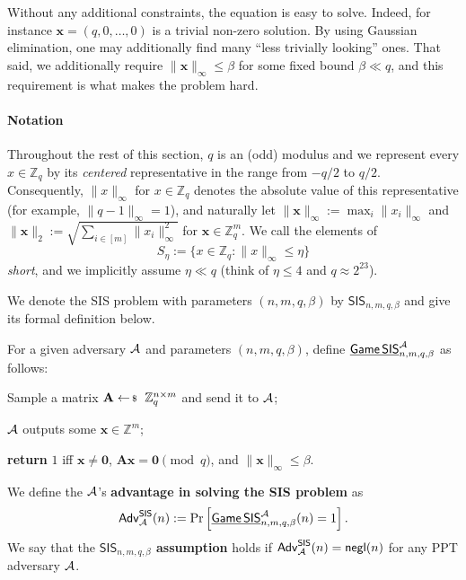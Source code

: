 \documentclass[../../book.tex]{subfiles}
\begin{document}
Without any additional constraints, the equation is easy to solve. Indeed, for instance $\mathbf{x} = (q,0,\dots,0)$ is a trivial non-zero solution. By using Gaussian elimination, one may additionally find many ``less trivially looking'' ones.
That said, we additionally require $\|\mathbf{x}\|_{\infty} \leq \beta$ for some fixed bound $\beta \ll q$, and this requirement is what makes the problem hard.

\paragraph{Notation}
Throughout the rest of this section, $q$ is an (odd) modulus and we represent every $x \in \mathbb{Z}_q$ by its \emph{centered} representative in the range from $-q/2$ to $q/2$.
Consequently, $\|x\|_{\infty}$ for $x \in \mathbb{Z}_q$ denotes the absolute value of this representative (for example, $\|q-1\|_{\infty} = 1$), and naturally let $\|\mathbf{x}\|_{\infty} := \max_i \|x_i\|_{\infty}$ and $\|\mathbf{x}\|_2 := \sqrt{\sum_{i \in [m]} \|x_i\|_{\infty}^2}$ for $\mathbf{x} \in \mathbb{Z}_q^m$.
We call the elements of
\begin{equation*}
    S_{\eta} := \{x \in \mathbb{Z}_q: \|x\|_{\infty} \leq \eta\}
\end{equation*}
\emph{short}, and we implicitly assume $\eta \ll q$ (think of $\eta \leq 4$ and $q \approx 2^{23}$).

We denote the SIS problem with parameters $(n,m,q,\beta)$ by $\mathsf{SIS}_{n,m,q,\beta}$ and give its formal definition below.

\begin{definition}\label{def:sis}
    For a given adversary $\mathcal{A}$ and parameters $(n,m,q,\beta)$, define $\underline{\mathsf{Game}\,\mathsf{SIS}}^{\mathcal{A}}_{n,m,q,\beta}$ as follows:
    \begin{algoen}
        \item Sample a matrix $\mathbf{A} \leftarrowS \mathbb{Z}_q^{n \times m}$ and send it to $\mathcal{A}$;
        \item $\mathcal{A}$ outputs some $\mathbf{x} \in \mathbb{Z}^m$;
        \item \textbf{return} $1$ iff $\mathbf{x} \neq \mathbf{0}$, $\mathbf{A}\mathbf{x} = \mathbf{0} \pmod{q}$, and $\|\mathbf{x}\|_{\infty} \leq \beta$.
    \end{algoen}
    We define the $\mathcal{A}$'s \textbf{advantage in solving the SIS problem} as
    \begin{equation*}
        \mathsf{Adv}^{\mathsf{SIS}}_{\mathcal{A}}(n) := \Pr\left[\underline{\mathsf{Game}\,\mathsf{SIS}}^{\mathcal{A}}_{n,m,q,\beta}(n) = 1\right].
    \end{equation*}
    We say that the \textbf{$\mathsf{SIS}_{n,m,q,\beta}$ assumption} holds if $\mathsf{Adv}^{\mathsf{SIS}}_{\mathcal{A}}(n) = \mathsf{negl}(n)$ for any PPT adversary $\mathcal{A}$.
\end{definition}
\end{document}
